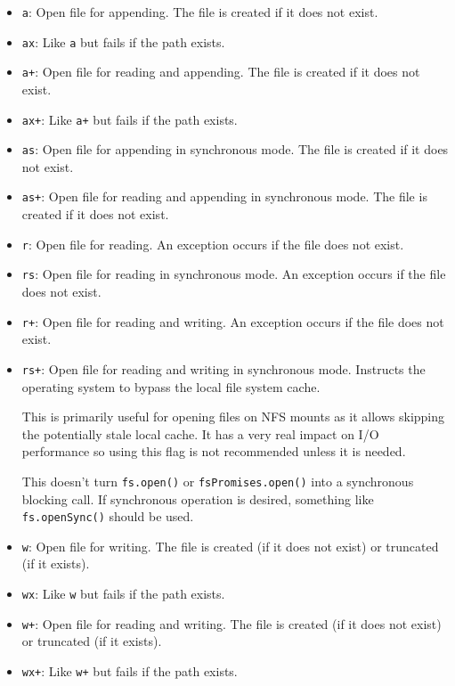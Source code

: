 \begin{itemize}
\item
  \texttt{\textquotesingle{}a\textquotesingle{}}: Open file for
  appending. The file is created if it does not exist.
\item
  \texttt{\textquotesingle{}ax\textquotesingle{}}: Like
  \texttt{\textquotesingle{}a\textquotesingle{}} but fails if the path
  exists.
\item
  \texttt{\textquotesingle{}a+\textquotesingle{}}: Open file for reading
  and appending. The file is created if it does not exist.
\item
  \texttt{\textquotesingle{}ax+\textquotesingle{}}: Like
  \texttt{\textquotesingle{}a+\textquotesingle{}} but fails if the path
  exists.
\item
  \texttt{\textquotesingle{}as\textquotesingle{}}: Open file for
  appending in synchronous mode. The file is created if it does not
  exist.
\item
  \texttt{\textquotesingle{}as+\textquotesingle{}}: Open file for
  reading and appending in synchronous mode. The file is created if it
  does not exist.
\item
  \texttt{\textquotesingle{}r\textquotesingle{}}: Open file for reading.
  An exception occurs if the file does not exist.
\item
  \texttt{\textquotesingle{}rs\textquotesingle{}}: Open file for reading
  in synchronous mode. An exception occurs if the file does not exist.
\item
  \texttt{\textquotesingle{}r+\textquotesingle{}}: Open file for reading
  and writing. An exception occurs if the file does not exist.
\item
  \texttt{\textquotesingle{}rs+\textquotesingle{}}: Open file for
  reading and writing in synchronous mode. Instructs the operating
  system to bypass the local file system cache.

  This is primarily useful for opening files on NFS mounts as it allows
  skipping the potentially stale local cache. It has a very real impact
  on I/O performance so using this flag is not recommended unless it is
  needed.

  This doesn't turn \texttt{fs.open()} or \texttt{fsPromises.open()}
  into a synchronous blocking call. If synchronous operation is desired,
  something like \texttt{fs.openSync()} should be used.
\item
  \texttt{\textquotesingle{}w\textquotesingle{}}: Open file for writing.
  The file is created (if it does not exist) or truncated (if it
  exists).
\item
  \texttt{\textquotesingle{}wx\textquotesingle{}}: Like
  \texttt{\textquotesingle{}w\textquotesingle{}} but fails if the path
  exists.
\item
  \texttt{\textquotesingle{}w+\textquotesingle{}}: Open file for reading
  and writing. The file is created (if it does not exist) or truncated
  (if it exists).
\item
  \texttt{\textquotesingle{}wx+\textquotesingle{}}: Like
  \texttt{\textquotesingle{}w+\textquotesingle{}} but fails if the path
  exists.
\end{itemize}

